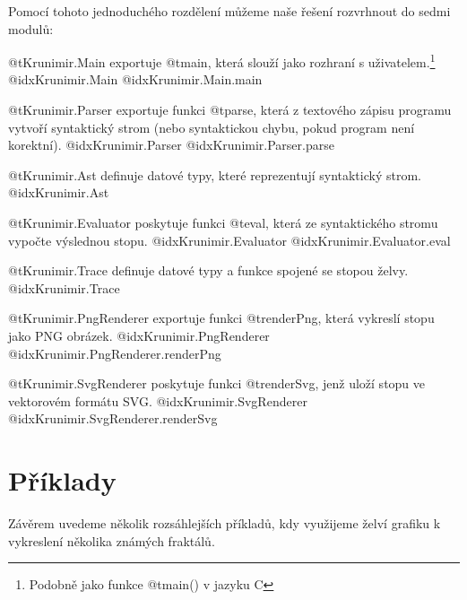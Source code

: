 Pomocí tohoto jednoduchého rozdělení můžeme naše řešení rozvrhnout do sedmi
modulů:

\begin{description}

\item @t{Krunimir.Main} exportuje @t{main}, která slouží jako rozhraní s
uživatelem.\footnote{Podobně jako funkce @t{main()} v jazyku C}
  @idx{Krunimir.Main}
  @idx{Krunimir.Main.main}

\item @t{Krunimir.Parser} exportuje funkci @t{parse}, která z textového
zápisu programu vytvoří syntaktický strom (nebo syntaktickou chybu, pokud
program není korektní).
  @idx{Krunimir.Parser}
  @idx{Krunimir.Parser.parse}

\item @t{Krunimir.Ast} definuje datové typy, které reprezentují syntaktický
strom.
  @idx{Krunimir.Ast}

\item @t{Krunimir.Evaluator} poskytuje funkci @t{eval}, která ze
syntaktického stromu vypočte výslednou stopu.
  @idx{Krunimir.Evaluator}
  @idx{Krunimir.Evaluator.eval}

\item @t{Krunimir.Trace} definuje datové typy a funkce spojené se stopou želvy.
  @idx{Krunimir.Trace}

\item @t{Krunimir.PngRenderer} exportuje funkci @t{renderPng}, která vykreslí
  stopu jako PNG obrázek.
  @idx{Krunimir.PngRenderer}
  @idx{Krunimir.PngRenderer.renderPng}

\item @t{Krunimir.SvgRenderer} poskytuje funkci @t{renderSvg}, jenž uloží stopu
  ve vektorovém formátu SVG.
  @idx{Krunimir.SvgRenderer}
  @idx{Krunimir.SvgRenderer.renderSvg}

\end{description}









\section{Příklady}

Závěrem uvedeme několik rozsáhlejších příkladů, kdy využijeme želví grafiku k
vykreslení několika známých fraktálů. 

